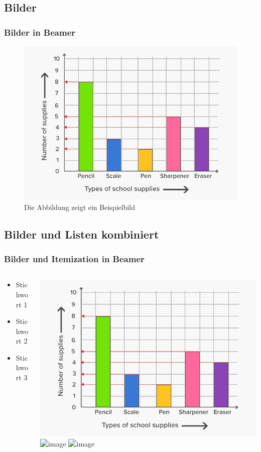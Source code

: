 \documentclass[compress,aspectratio=169]{beamer} %
\begin{document}
	\subsection{Bilder} 
	\begin{frame}\frametitle{Bilder in Beamer}
		\begin{figure}
			\includegraphics[scale=0.3]{PIC1} 
			\caption{Die Abbildung zeigt ein Beispielbild}
		\end{figure}
	\end{frame}
	
	
	\subsection{Bilder und Listen kombiniert} 
	
	\begin{frame}
		\frametitle{Bilder und Itemization in Beamer}
		\begin{columns}
			\begin{column}{5cm}
				\begin{itemize}
					\item<1-> Stichwort 1
					\item<3-> Stichwort 2
					\item<5-> Stichwort 3
				\end{itemize}
				\vspace{3cm} 
			\end{column}
			\begin{column}{5cm}
				\begin{overprint}
					\includegraphics<2>[scale=0.1]{PIC1}
					\includegraphics<4>[scale=0.1]{PIC2}
					\includegraphics<6>[scale=0.1]{PIC3}
				\end{overprint}
			\end{column}
		\end{columns}
	\end{frame}
	
\end{document}
